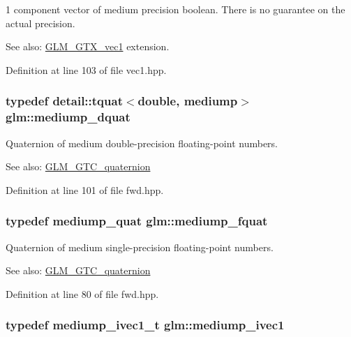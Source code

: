 1 component vector of medium precision boolean. There is no guarantee on the actual precision. \begin{Desc}
\item[See also:]\hyperlink{group__gtx__vec1}{GLM\_\-GTX\_\-vec1} extension. \end{Desc}


Definition at line 103 of file vec1.hpp.\hypertarget{namespaceglm_302e27293c89ef6128f4eb14ea06ec8b}{
\subsubsection[mediump\_\-dquat]{\setlength{\rightskip}{0pt plus 5cm}typedef detail::tquat$<$double, mediump$>$ {\bf glm::mediump\_\-dquat}}}
\label{namespaceglm_302e27293c89ef6128f4eb14ea06ec8b}


Quaternion of medium double-precision floating-point numbers.

\begin{Desc}
\item[See also:]\hyperlink{group__gtc__quaternion}{GLM\_\-GTC\_\-quaternion} \end{Desc}


Definition at line 101 of file fwd.hpp.\hypertarget{namespaceglm_154ae157e20a677e5663d97b923b1053}{
\subsubsection[mediump\_\-fquat]{\setlength{\rightskip}{0pt plus 5cm}typedef {\bf mediump\_\-quat} {\bf glm::mediump\_\-fquat}}}
\label{namespaceglm_154ae157e20a677e5663d97b923b1053}


Quaternion of medium single-precision floating-point numbers.

\begin{Desc}
\item[See also:]\hyperlink{group__gtc__quaternion}{GLM\_\-GTC\_\-quaternion} \end{Desc}


Definition at line 80 of file fwd.hpp.\hypertarget{namespaceglm_7efcceaaa791c2380d1b17bd7baa45ee}{
\subsubsection[mediump\_\-ivec1]{\setlength{\rightskip}{0pt plus 5cm}typedef mediump\_\-ivec1\_\-t {\bf glm::mediump\_\-ivec1}}}
\label{namespaceglm_7efcceaaa791c2380d1b17bd7baa45ee}


